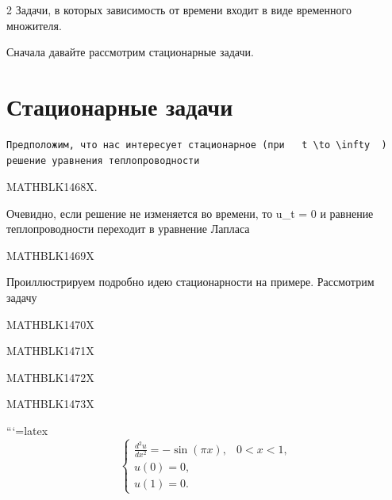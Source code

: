 \documentclass[
]{article}
\begin{document}
2 Задачи, в которых зависимость от времени входит в виде временного
множителя.

Сначала давайте рассмотрим стационарные задачи.

\section{Стационарные
задачи}\label{ux441ux442ux430ux446ux438ux43eux43dux430ux440ux43dux44bux435-ux437ux430ux434ux430ux447ux438}

\begin{verbatim}
Предположим, что нас интересует стационарное (при   t \to \infty  ) решение уравнения теплопроводности
\end{verbatim}

MATHBLK1468X.

Очевидно, если решение не изменяется во времени, то u\_t = 0 и равнение
теплопроводности переходит в уравнение Лапласа

MATHBLK1469X

Проиллюстрируем подробно идею стационарности на примере. Рассмотрим
задачу

MATHBLK1470X

MATHBLK1471X

MATHBLK1472X

MATHBLK1473X

```{=latex}
\[
\begin{cases} \frac{d^{2}u}{dx^{2}} = -\sin(\pi x), & 0 < x < 1, \\ u(0) = 0, \\ u(1) = 0. \end{cases}
\]
\end{document}
